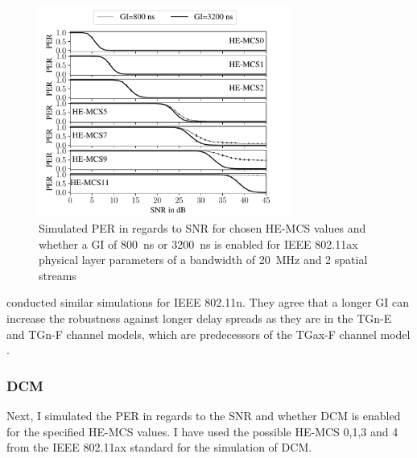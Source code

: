 \begin{figure}[H]%
   \centering
   \includegraphics[width=0.74\textwidth]{figures/GI_PER_to_SNR.pdf}
   \caption{Simulated \ac{PER} in regards to \ac{SNR} for chosen \ac{HE}-\ac{MCS} values and whether a \ac{GI} of \SI{800}{\nano\second} or \SI{3200}{\nano\second} is enabled for IEEE 802.11ax physical layer parameters of a bandwidth of \SI{20}{\mega\hertz} and 2 spatial streams}%
   \label{fig:PER_SNR_GI}%
\end{figure}
\textcite{patil_ieee_2020} conducted similar simulations for IEEE 802.11n.
They agree that a longer \ac{GI} can increase the robustness against longer delay spreads as they are in the TGn-E and TGn-F channel models,
which are predecessors of the TGax-F channel model \cite{TGAXCHANNEL}.

\subsubsection*{\acf{DCM}}
Next, I simulated the \ac{PER} in regards to the \ac{SNR}  and whether \ac{DCM} is enabled for the specified \ac{HE}-\ac{MCS} values.
I have used the possible \ac{HE}-\ac{MCS} \num{0},\num{1},\num{3} and \num{4} from the IEEE 802.11ax standard \cite{ieee_standard_2021ax} for the
simulation of \ac{DCM}.

